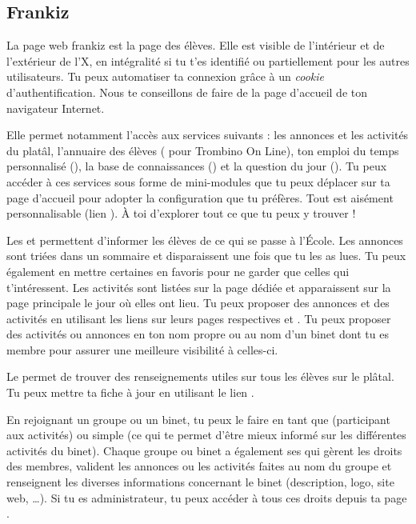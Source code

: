 \subsection{Frankiz}
\label{frankiz} La page web frankiz est la page des \'el\`eves. Elle est visible de l'int\'erieur et de
l'ext\'erieur de l'X, en int\'egralit\'e si tu t'es identifi\'e ou partiellement pour les autres
utilisateurs. Tu peux automatiser ta connexion gr\^ace \`a  un \emph{cookie} d'authentification. Nous te
conseillons de faire de  la page d'accueil de ton navigateur Internet.

Elle permet notamment l'acc\`es aux services suivants : les
annonces et les activit\'es du plat\^al, l'annuaire des \'el\`eves
( pour Trombino On Line), ton emploi du temps personnalis\'e (), la base de connaissances () et
la question du jour (). Tu peux accéder à ces services sous forme de mini-modules que tu peux d\'eplacer sur ta page d'accueil pour adopter la configuration que tu préfères. Tout est ais\'ement personnalisable (lien ). \`A toi d'explorer tout ce que tu peux y trouver !

Les  et  permettent d'informer les \'el\`eves de ce qui se passe \`a  l'\'Ecole. Les annonces sont tri\'ees dans
un sommaire et disparaissent une fois que tu les as lues. Tu peux \'egalement en mettre certaines en favoris pour ne garder que celles qui t'int\'eressent. Les activit\'es sont list\'ees sur la page d\'edi\'ee et apparaissent
sur la page principale le jour o\`u elles ont lieu. Tu peux proposer des annonces et des activit\'es en utilisant les liens sur leurs pages respectives  et . Tu peux proposer des activit\'es ou annonces en ton nom propre ou au nom d'un binet dont tu es membre pour assurer une meilleure visibilit\'e \`a celles-ci.

Le  permet de trouver des renseignements utiles sur
tous les \'el\`eves sur le pl\^atal. Tu peux mettre ta fiche \`a  jour en
utilisant le lien .

En rejoignant un groupe ou un binet, tu peux le faire en tant que  (participant aux activit\'es) ou simple  (ce qui te permet d'être mieux informé sur les différentes activités du binet). Chaque groupe ou binet a \'egalement ses  qui g\`erent les droits des membres, valident les annonces ou les activit\'es faites au nom du groupe et renseignent les diverses informations concernant le binet (description, logo, site web, \dots). Si tu es administrateur, tu peux acc\'eder \`a tous ces droits depuis ta page .

